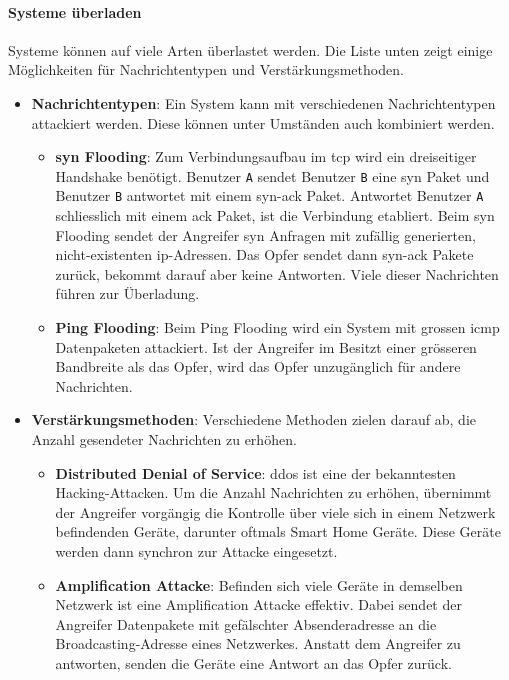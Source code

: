 \documentclass[11pt, a4paper]{article}
\begin{document}
\paragraph{Systeme überladen}
Systeme können auf viele Arten überlastet werden. Die Liste unten zeigt einige Möglichkeiten für Nachrichtentypen und Verstärkungsmethoden. 
\begin{itemize}
	\item \textbf{Nachrichtentypen}: Ein System kann mit verschiedenen Nachrichtentypen attackiert werden. Diese können unter Umständen auch kombiniert werden.
	\begin{itemize}
		\item \textbf{\gls{syn} Flooding}: Zum Verbindungsaufbau im \gls{tcp} wird ein dreiseitiger Handshake benötigt. Benutzer \texttt{A} sendet Benutzer \texttt{B} eine \gls{syn} Paket und Benutzer \texttt{B} antwortet mit einem \gls{syn}-\gls{ack} Paket. Antwortet Benutzer \texttt{A} schliesslich mit einem \gls{ack} Paket, ist die Verbindung etabliert. Beim \gls{syn} Flooding sendet der Angreifer \gls{syn} Anfragen mit zufällig generierten, nicht-existenten \gls{ip}-Adressen. Das Opfer sendet dann \gls{syn}-\gls{ack} Pakete zurück, bekommt darauf aber keine Antworten. Viele dieser Nachrichten führen zur Überladung.
		\item \textbf{Ping Flooding}: Beim Ping Flooding wird ein System mit grossen \gls{icmp} Datenpaketen attackiert. Ist der Angreifer im Besitzt einer grösseren Bandbreite als das Opfer, wird das Opfer unzugänglich für andere Nachrichten.
	\end{itemize}
	\item \textbf{Verstärkungsmethoden}: Verschiedene Methoden zielen darauf ab, die Anzahl gesendeter Nachrichten zu erhöhen.
	\begin{itemize}
		\item \textbf{Distributed Denial of Service}: \gls{ddos} ist eine der bekanntesten Hacking-Attacken. Um die Anzahl Nachrichten zu erhöhen, übernimmt der Angreifer vorgängig die Kontrolle über viele sich in einem Netzwerk befindenden Geräte, darunter oftmals Smart Home Geräte. Diese Geräte werden dann synchron zur Attacke eingesetzt.
		\item \textbf{Amplification Attacke}: Befinden sich viele Geräte in demselben Netzwerk ist eine Amplification Attacke effektiv. Dabei sendet der Angreifer Datenpakete mit gefälschter Absenderadresse an die Broadcasting-Adresse eines Netzwerkes. Anstatt dem Angreifer zu antworten, senden die Geräte eine Antwort an das Opfer zurück. 
	\end{itemize}
\end{itemize}
\end{document}
